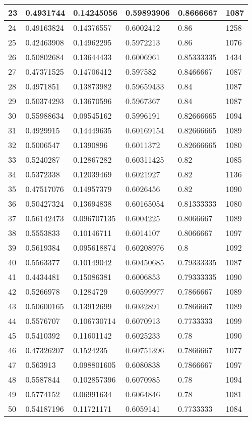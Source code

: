 \begin{longtable}{|l|l|l|l|l|l|}
23 & 0.4931744 & 0.14245056 & 0.59893906 & 0.8666667 & 1087 \\ \hline 
24 & 0.49163824 & 0.14376557 & 0.6002412 & 0.86 & 1258 \\ \hline 
25 & 0.42463908 & 0.14962295 & 0.5972213 & 0.86 & 1076 \\ \hline 
26 & 0.50802684 & 0.13644433 & 0.6006961 & 0.85333335 & 1434 \\ \hline 
27 & 0.47371525 & 0.14706412 & 0.597582 & 0.8466667 & 1087 \\ \hline 
28 & 0.4971851 & 0.13873982 & 0.59659433 & 0.84 & 1087 \\ \hline 
29 & 0.50374293 & 0.13670596 & 0.5967367 & 0.84 & 1087 \\ \hline 
30 & 0.55988634 & 0.09545162 & 0.5996191 & 0.82666665 & 1094 \\ \hline 
31 & 0.4929915 & 0.14449635 & 0.60169154 & 0.82666665 & 1089 \\ \hline 
32 & 0.5006547 & 0.1390896 & 0.6011372 & 0.82666665 & 1080 \\ \hline 
33 & 0.5240287 & 0.12867282 & 0.60311425 & 0.82 & 1085 \\ \hline 
34 & 0.5372338 & 0.12039469 & 0.6021927 & 0.82 & 1136 \\ \hline 
35 & 0.47517076 & 0.14957379 & 0.6026456 & 0.82 & 1090 \\ \hline 
36 & 0.50427324 & 0.13694838 & 0.60165054 & 0.81333333 & 1080 \\ \hline 
37 & 0.56142473 & 0.096707135 & 0.6004225 & 0.8066667 & 1089 \\ \hline 
38 & 0.5553833 & 0.10146711 & 0.6014107 & 0.8066667 & 1097 \\ \hline 
39 & 0.5619384 & 0.095618874 & 0.60208976 & 0.8 & 1092 \\ \hline 
40 & 0.5563377 & 0.10149042 & 0.60450685 & 0.79333335 & 1087 \\ \hline 
41 & 0.4434481 & 0.15086381 & 0.6006853 & 0.79333335 & 1090 \\ \hline 
42 & 0.5266978 & 0.1284729 & 0.60599977 & 0.7866667 & 1089 \\ \hline 
43 & 0.50600165 & 0.13912699 & 0.6032891 & 0.7866667 & 1089 \\ \hline 
44 & 0.5576707 & 0.106730714 & 0.6070913 & 0.7733333 & 1099 \\ \hline 
45 & 0.5410392 & 0.11601142 & 0.6025233 & 0.78 & 1090 \\ \hline 
46 & 0.47326207 & 0.1524235 & 0.60751396 & 0.7866667 & 1077 \\ \hline 
47 & 0.563913 & 0.098801605 & 0.6080838 & 0.7866667 & 1097 \\ \hline 
48 & 0.5587844 & 0.102857396 & 0.6070985 & 0.78 & 1094 \\ \hline 
49 & 0.5774152 & 0.06991634 & 0.6064846 & 0.78 & 1081 \\ \hline 
50 & 0.54187196 & 0.11721171 & 0.6059141 & 0.7733333 & 1084 \\ \hline 
\end{longtable}